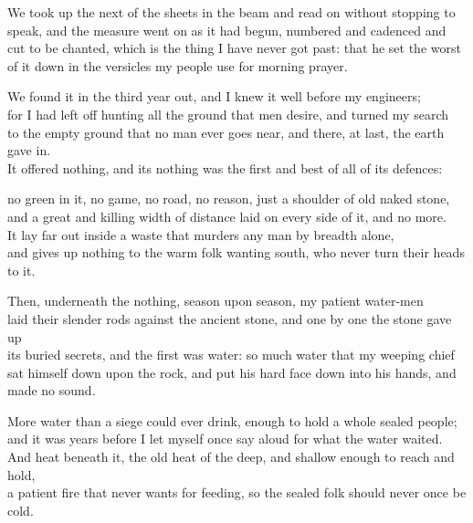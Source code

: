 
We took up the next of the sheets in the beam and read on without stopping to speak, and the measure went on as it had begun, numbered and cadenced and cut to be chanted, which is the thing I have never got past: that he set the worst of it down in the versicles my people use for morning prayer.\par

\ornament

\begin{scripture}
We found it in the third year out, and I knew it well before my engineers; \\
for I had left off hunting all the ground that men desire, and turned my search \\
to the empty ground that no man ever goes near, and there, at last, the earth gave in. \\
It offered nothing, and its nothing was the first and best of all of its defences: \\
\medskip

no green in it, no game, no road, no reason, just a shoulder of old naked stone, \\
and a great and killing width of distance laid on every side of it, and no more. \\
It lay far out inside a waste that murders any man by breadth alone, \\
and gives up nothing to the warm folk wanting south, who never turn their heads to it. \\
\medskip

Then, underneath the nothing, season upon season, my patient water-men \\
laid their slender rods against the ancient stone, and one by one the stone gave up \\
its buried secrets, and the first was water: so much water that my weeping chief \\
sat himself down upon the rock, and put his hard face down into his hands, and made no sound. \\
\medskip

More water than a siege could ever drink, enough to hold a whole sealed people; \\
and it was years before I let myself once say aloud for what the water waited. \\
And heat beneath it, the old heat of the deep, and shallow enough to reach and hold, \\
a patient fire that never wants for feeding, so the sealed folk should never once be cold. \\
\medskip


\end{scripture}
